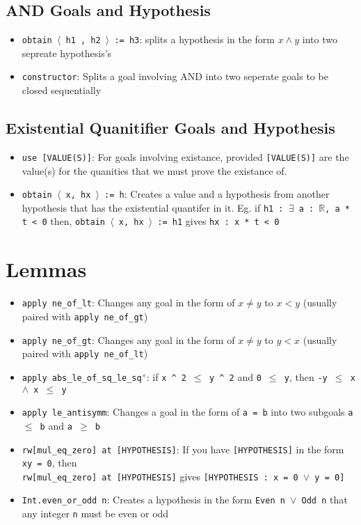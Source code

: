\documentclass{exam}
\newcommand{\RR}{\mathbb R}
\begin{document}
    \subsection*{AND Goals and Hypothesis}
    \begin{itemize}
        \item \texttt{obtain $\langle$ h1 , h2 $\rangle$ := h3}: splits a hypothesis in the form $x \land y$ into two sepreate hypothesis's
        \item \verb|constructor|: Splits a goal involving AND into two seperate goals to be closed sequentially
    \end{itemize}
    \subsection*{Existential Quanitifier Goals and Hypothesis}
    \begin{itemize}
        \item \verb|use [VALUE(S)]|: For goals involving existance, provided \texttt{[VALUE(S)]} are the value(s) for the quanities that we must prove the existance of.
        \item \texttt{obtain $\langle$ x, hx $\rangle$ := h}: Creates a value and a hypothesis from another hypothesis that has the existential quantifer in it. Eg. if \texttt{h1 : $\exists$ a : $\RR$, a * t < 0} then, \texttt{obtain $\langle$ x, hx $\rangle$ := h1} gives \texttt{hx : x * t < 0}
    \end{itemize}
    \section*{Lemmas}
    \begin{itemize}
        \item \verb|apply ne_of_lt|: Changes any goal in the form of $x \neq y$ to $x < y$ (usually paired with \verb|apply ne_of_gt|)
        \item \verb|apply ne_of_gt|: Changes any goal in the form of $x \neq y$ to $y < x$ (usually paired with \verb|apply ne_of_lt|)
        \item \verb|apply abs_le_of_sq_le_sq'|: if \texttt{x \^{} 2 $\leq$ y \^{} 2} and \texttt{0 $\leq$ y}, then \texttt{-y $\leq$ x $\land$ x $\leq$ y}
        \item \verb|apply le_antisymm|: Changes a goal in the form of \texttt{a = b} into two subgoals \texttt{a $\leq$ b} and \texttt{a $\geq$ b}
        \item \verb|rw[mul_eq_zero] at [HYPOTHESIS]|: If you have \texttt{[HYPOTHESIS]} in the form \texttt{xy = 0}, then \\ \verb|rw[mul_eq_zero] at [HYPOTHESIS]| gives \texttt{[HYPOTHESIS : x = 0 $\lor$ y = 0]}
        \item \verb|Int.even_or_odd n|: Creates a hypothesis in the form \texttt{Even n $\lor$ Odd n} that any integer \texttt{n} must be even or odd
    \end{itemize}
\end{document}
